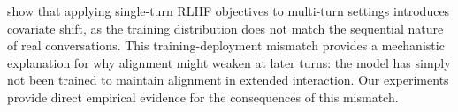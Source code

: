 \citet{shi2024multiturn_rlhf} show that applying single-turn RLHF objectives to multi-turn settings introduces covariate shift, as the training distribution does not match the sequential nature of real conversations. This training-deployment mismatch provides a mechanistic explanation for why alignment might weaken at later turns: the model has simply not been trained to maintain alignment in extended interaction. Our experiments provide direct empirical evidence for the consequences of this mismatch.
